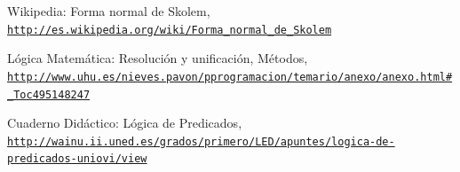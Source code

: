 \documentclass{article}
\begin{document}
\begin{thebibliography}{9}

Wikipedia: Forma normal de Skolem,
\\\texttt{\url{http://es.wikipedia.org/wiki/Forma\_normal\_de\_Skolem}}

L\'ogica Matem\'atica: Resoluci\'on y unificaci\'on, M\'etodos,
\\\texttt{\url{http://www.uhu.es/nieves.pavon/pprogramacion/temario/anexo/anexo.html\#\_Toc495148247}}

Cuaderno Did\'actico: L\'ogica de Predicados,
\\\texttt{\url{http://wainu.ii.uned.es/grados/primero/LED/apuntes/logica-de-predicados-uniovi/view}}
\end{thebibliography}
\end{document}
